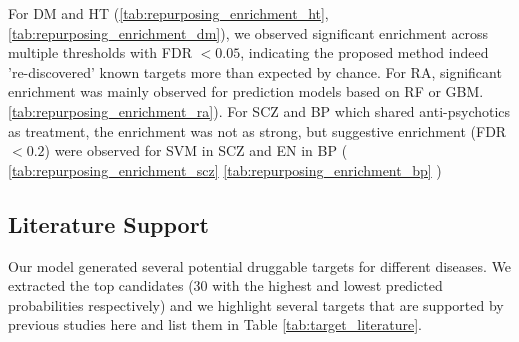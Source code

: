     For DM and HT (\ref{tab:repurposing_enrichment_ht}, \ref{tab:repurposing_enrichment_dm}), we observed significant enrichment across multiple thresholds with FDR $< 0.05$, indicating the proposed method indeed 're-discovered' known targets more than expected by chance. For RA, significant enrichment was mainly observed for prediction models based on RF or GBM. \ref{tab:repurposing_enrichment_ra}). For SCZ and BP which shared anti-psychotics as treatment, the enrichment was not as strong, but suggestive enrichment (FDR $< 0.2 $) were observed for SVM in SCZ and EN in BP ( \ref{tab:repurposing_enrichment_scz}  \ref{tab:repurposing_enrichment_bp} )

  \subsection{Literature Support}
    Our model generated several potential druggable targets for different diseases. We extracted the top candidates (30 with the highest and lowest predicted probabilities respectively) and we highlight several targets that are supported by previous studies here and list them in Table \ref{tab:target_literature}. 
      
